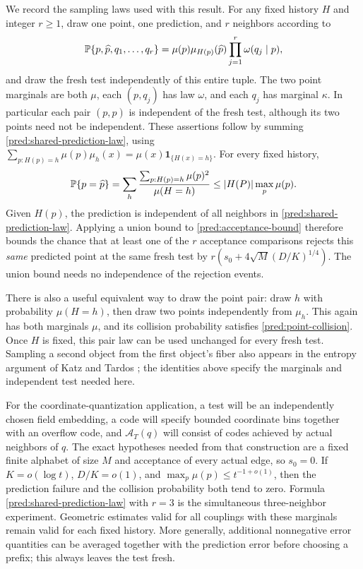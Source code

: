We record the sampling laws used with this result.  For any fixed history
\(H\) and integer \(r\ge1\), draw one point, one prediction, and \(r\)
neighbors according to
\begin{equation}\label{pred:shared-prediction-law}
 \mathbb P\{p,\widehat p,q_1,\ldots,q_r\}
 =\mu(p)\mu_{H(p)}(\widehat p)
             \prod_{j=1}^r\omega(q_j\mid p),
\end{equation}
and draw the fresh test independently of this entire tuple.  The two point
marginals are both \(\mu\), each \((p,q_j)\) has law \(\omega\), and each
\(q_j\) has marginal \(\kappa\).  In particular each pair
\((p,\widehat p)\) is independent of the fresh test, although its two points
need not be independent.  These assertions follow by summing
\eqref{pred:shared-prediction-law}, using
\(\sum_{p:H(p)=h}\mu(p)\mu_h(x)=\mu(x)\mathbf1_{\{H(x)=h\}}\).
For every fixed history,
\begin{equation}\label{pred:point-collision}
 \mathbb P\{p=\widehat p\}
 =\sum_h\frac{\sum_{p:H(p)=h}\mu(p)^2}{\mu(H=h)}
 \le\lvert H(P)\rvert\max_p\mu(p).
\end{equation}
Given \(H(p)\), the prediction is independent of all neighbors in
\eqref{pred:shared-prediction-law}.  Applying a union bound to
\eqref{pred:acceptance-bound} therefore bounds the chance that at least one
of the \(r\) acceptance comparisons rejects this \emph{same} predicted point
at the same fresh test by
\(r(s_0+4\sqrt M(D/K)^{1/4})\).  The union bound needs no independence of
the rejection events.

There is also a useful equivalent way to draw the point pair: draw
\(h\) with probability \(\mu(H=h)\), then draw two points independently
from \(\mu_h\).  This again has both marginals \(\mu\), and its collision
probability satisfies \eqref{pred:point-collision}.  Once \(H\) is fixed,
this pair law can be used unchanged for every fresh test. Sampling a second
object from the first object's fiber also appears in the entropy argument
of Katz and Tardos \cite[Section~2, proof of Lemma~1]{KatzTardos}; the
identities above specify the marginals and independent test needed here.

For the coordinate-quantization application, a test will be an independently
chosen field embedding, a code will specify bounded coordinate bins together
with an overflow code, and \(\mathcal A_T(q)\) will consist of codes achieved
by actual neighbors of \(q\).  The exact hypotheses needed from that
construction are a fixed finite alphabet of size \(M\) and acceptance of
every actual edge, so \(s_0=0\).  If \(K=o(\log t)\),
\(D/K=o(1)\), and \(\max_p\mu(p)\le t^{-1+o(1)}\), then the prediction
failure and the collision probability both tend to zero.  Formula
\eqref{pred:shared-prediction-law} with \(r=3\) is the simultaneous
three-neighbor experiment.  Geometric estimates valid for all couplings with
these marginals remain valid for each fixed history.  More generally,
additional nonnegative error quantities can be averaged together with the
prediction error before choosing a prefix; this always leaves the test fresh.

